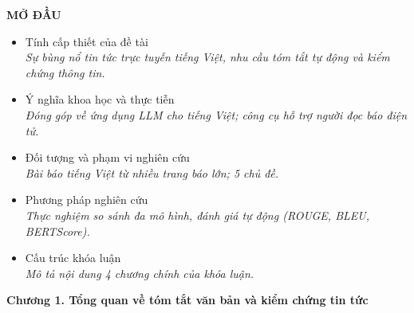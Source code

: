 \documentclass[a4paper,12pt]{article}
\begin{document}
{\fontsize{13pt}{15pt}\selectfont\bfseries MỞ ĐẦU}
\begin{itemize}[leftmargin=1cm, labelsep=0.3cm, itemsep=3pt, label={--}]
  \item Tính cấp thiết của đề tài \\
    {\small\itshape Sự bùng nổ tin tức trực tuyến tiếng Việt, nhu cầu tóm tắt tự động và kiểm chứng thông tin.}
  \item Ý nghĩa khoa học và thực tiễn \\
    {\small\itshape Đóng góp về ứng dụng LLM cho tiếng Việt; công cụ hỗ trợ người đọc báo điện tử.}
  \item Đối tượng và phạm vi nghiên cứu \\
    {\small\itshape Bài báo tiếng Việt từ nhiều trang báo lớn; 5 chủ đề.}
  \item Phương pháp nghiên cứu \\
    {\small\itshape Thực nghiệm so sánh đa mô hình, đánh giá tự động (ROUGE, BLEU, BERTScore).}
  \item Cấu trúc khóa luận \\
    {\small\itshape Mô tả nội dung 4 chương chính của khóa luận.}
\end{itemize}

\vspace{0.5cm}

{\fontsize{13pt}{15pt}\selectfont\bfseries Chương 1. Tổng quan về tóm tắt văn bản và kiểm chứng tin tức}
\end{document}
